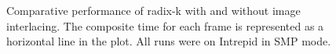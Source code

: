 \documentclass{acm_proc_article-sp}
\begin{document}
\begin{figure}[htbp]
  \centering
  \hfill
  \caption{Comparative performance of radix-k with and without image
    interlacing.  The composite time for each frame is represented as a
    horizontal line in the plot.  All runs were on Intrepid in SMP mode.}
  \label{fig:InterlacePerformance}
\end{figure}
\end{document}
